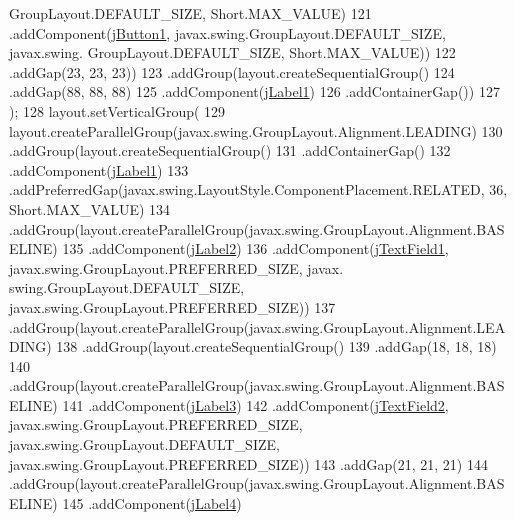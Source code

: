 \begin{DoxyCode}
      GroupLayout.DEFAULT\_SIZE, Short.MAX\_VALUE)
121                     .addComponent(\mbox{\hyperlink{class_interfaz_package_1_1_interfaz_registro_a591a9233d6e086496804607414f1ccee}{jButton1}}, javax.swing.GroupLayout.DEFAULT\_SIZE, javax.swing.
      GroupLayout.DEFAULT\_SIZE, Short.MAX\_VALUE))
122                 .addGap(23, 23, 23))
123             .addGroup(layout.createSequentialGroup()
124                 .addGap(88, 88, 88)
125                 .addComponent(\mbox{\hyperlink{class_interfaz_package_1_1_interfaz_registro_a5e039663e8682c6b2c3cc17dfa6ef899}{jLabel1}})
126                 .addContainerGap())
127         );
128         layout.setVerticalGroup(
129             layout.createParallelGroup(javax.swing.GroupLayout.Alignment.LEADING)
130             .addGroup(layout.createSequentialGroup()
131                 .addContainerGap()
132                 .addComponent(\mbox{\hyperlink{class_interfaz_package_1_1_interfaz_registro_a5e039663e8682c6b2c3cc17dfa6ef899}{jLabel1}})
133                 .addPreferredGap(javax.swing.LayoutStyle.ComponentPlacement.RELATED, 36, Short.MAX\_VALUE)
134                 .addGroup(layout.createParallelGroup(javax.swing.GroupLayout.Alignment.BASELINE)
135                     .addComponent(\mbox{\hyperlink{class_interfaz_package_1_1_interfaz_registro_a8b0b7e848f73f459a71f7677741b8171}{jLabel2}})
136                     .addComponent(\mbox{\hyperlink{class_interfaz_package_1_1_interfaz_registro_a19ed9a68b571a55582801c1726af9b06}{jTextField1}}, javax.swing.GroupLayout.PREFERRED\_SIZE, javax.
      swing.GroupLayout.DEFAULT\_SIZE, javax.swing.GroupLayout.PREFERRED\_SIZE))
137                 .addGroup(layout.createParallelGroup(javax.swing.GroupLayout.Alignment.LEADING)
138                     .addGroup(layout.createSequentialGroup()
139                         .addGap(18, 18, 18)
140                         .addGroup(layout.createParallelGroup(javax.swing.GroupLayout.Alignment.BASELINE)
141                             .addComponent(\mbox{\hyperlink{class_interfaz_package_1_1_interfaz_registro_a4189a19af12bde758a673e961e48f7a1}{jLabel3}})
142                             .addComponent(\mbox{\hyperlink{class_interfaz_package_1_1_interfaz_registro_a999435bfad451715c3e32330d21be7bb}{jTextField2}}, javax.swing.GroupLayout.PREFERRED\_SIZE, 
      javax.swing.GroupLayout.DEFAULT\_SIZE, javax.swing.GroupLayout.PREFERRED\_SIZE))
143                         .addGap(21, 21, 21)
144                         .addGroup(layout.createParallelGroup(javax.swing.GroupLayout.Alignment.BASELINE)
145                             .addComponent(\mbox{\hyperlink{class_interfaz_package_1_1_interfaz_registro_a4dda19c10aa23f67ca06e1b8a5a18912}{jLabel4}})

\end{DoxyCode}
